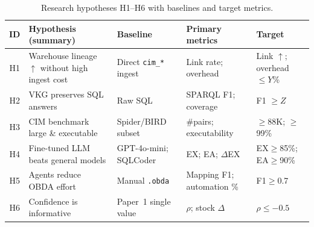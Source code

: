 \begin{table}[t]
  \centering
  \caption{Research hypotheses H1--H6 with baselines and target metrics.}
  \label{tab:hypotheses}
  \small
  \begin{tabular}{clp{3.5cm}p{2.8cm}p{2.5cm}}
    \toprule
    ID & Hypothesis (summary) & Baseline & Primary metrics & Target \\
    \midrule
    H1 & Warehouse lineage $\uparrow$ without high ingest cost & Direct \texttt{cim\_*} ingest & Link rate; overhead & Link $\uparrow$; overhead $\leq Y$\% \\
    H2 & VKG preserves SQL answers & Raw SQL & SPARQL F1; coverage & F1 $\geq Z$ \\
    H3 & CIM benchmark large \& executable & Spider/BIRD subset & \#pairs; executability & $\geq$88K; $\geq$99\% \\
    H4 & Fine-tuned LLM beats general models & GPT-4o-mini; SQLCoder & EX; EA; $\Delta$EX & EX$\geq$85\%; EA$\geq$90\% \\
    H5 & Agents reduce OBDA effort & Manual \texttt{.obda} & Mapping F1; automation \% & F1$\geq$0.7 \\
    H6 & Confidence is informative & Paper~1 single value & $\rho$; stock $\Delta$ & $\rho \leq -0.5$ \\
    \bottomrule
  \end{tabular}
\end{table}
